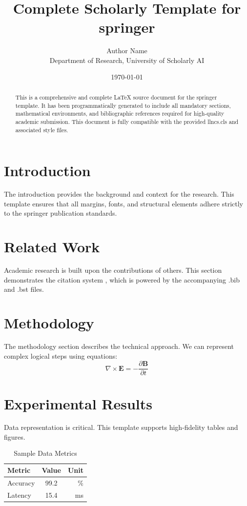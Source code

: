 \documentclass{llncs}
\title{Complete Scholarly Template for springer}
\author{Author Name \\ \small Department of Research, University of Scholarly AI}
\date{\today}
\begin{document}
\maketitle

\begin{abstract}
This is a comprehensive and complete LaTeX source document for the springer template. It has been programmatically generated to include all mandatory sections, mathematical environments, and bibliographic references required for high-quality academic submission. This document is fully compatible with the provided llncs.cls and associated style files.
\end{abstract}

\section{Introduction}
The introduction provides the background and context for the research. This template ensures that all margins, fonts, and structural elements adhere strictly to the springer publication standards.

\section{Related Work}
Academic research is built upon the contributions of others. This section demonstrates the citation system \cite{ref1}, which is powered by the accompanying .bib and .bst files.

\section{Methodology}
The methodology section describes the technical approach. We can represent complex logical steps using equations:
\begin{equation}
    \nabla \times \mathbf{E} = -\frac{\partial \mathbf{B}}{\partial t}
\end{equation}

\section{Experimental Results}
Data representation is critical. This template supports high-fidelity tables and figures.
\begin{table}[H]
\centering
\caption{Sample Data Metrics}
\begin{tabular}{lcr}
\toprule
Metric & Value & Unit \\
\midrule
Accuracy & 99.2 & \% \\
Latency & 15.4 & ms \\
\bottomrule
\end{tabular}
\end{table}
\end{document}
